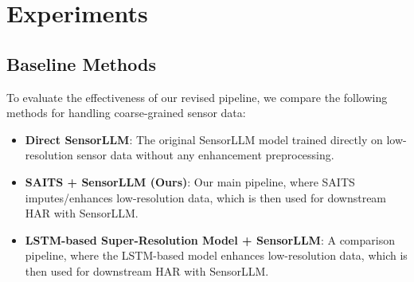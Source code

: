 \chapter{Experiments}

%
%
%    
%    
%    

\section{Baseline Methods}

\hspace{2em}To evaluate the effectiveness of our revised pipeline, we compare the following methods for handling coarse-grained sensor data:

\begin{itemize}
    \item \textbf{Direct SensorLLM}: The original SensorLLM model \cite{li2024sensorllm} trained directly on low-resolution sensor data without any enhancement preprocessing.
    \item \textbf{SAITS + SensorLLM (Ours)}: Our main pipeline, where SAITS imputes/enhances low-resolution data, which is then used for downstream HAR with SensorLLM.
    \item \textbf{LSTM-based Super-Resolution Model + SensorLLM}: A comparison pipeline, where the LSTM-based model enhances low-resolution data, which is then used for downstream HAR with SensorLLM.
\end{itemize}

